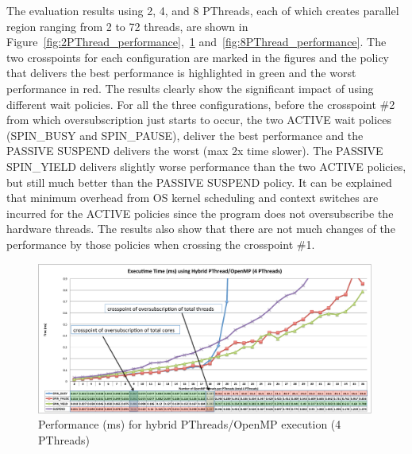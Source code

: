 The evaluation results using 2, 4, and 8 PThreads, each of which creates {\sf parallel} region ranging 
from 2 to 72 threads, are shown in Figure~\ref{fig:2PThread_performance},~\ref{fig:4PThread_performance} 
and~\ref{fig:8PThread_performance}. The two crosspoints for each configuration are marked in the figures and the 
policy that delivers the best performance is highlighted in green and the worst performance in red.
The results clearly show the significant impact of using different wait policies. For all the three configurations, 
before the crosspoint \#2 from which oversubscription just starts to occur, 
the two {\sf ACTIVE} wait polices ({\sf SPIN\_BUSY} and {\sf SPIN\_PAUSE}), deliver the best performance and 
the {\sf PASSIVE SUSPEND} delivers the worst (max 2x time slower). 
The {\sf PASSIVE SPIN\_YIELD} delivers slightly worse performance than the two {\sf ACTIVE} policies, but still much better than the 
{\sf PASSIVE SUSPEND} policy. 
It can be explained that minimum overhead from OS kernel scheduling and context switches are incurred for the {\sf ACTIVE} policies since 
the program does not oversubscribe the hardware threads. 
The results also show that there are not much changes of the performance by those policies when crossing the crosspoint \#1. 


\begin{figure}[h]
    \includegraphics[width=0.99\textwidth] {images/4PThread_performance}
    \caption{Performance (ms) for hybrid PThreads/OpenMP execution (4 PThreads)}
    \label{fig:4PThread_performance}
\end{figure}

